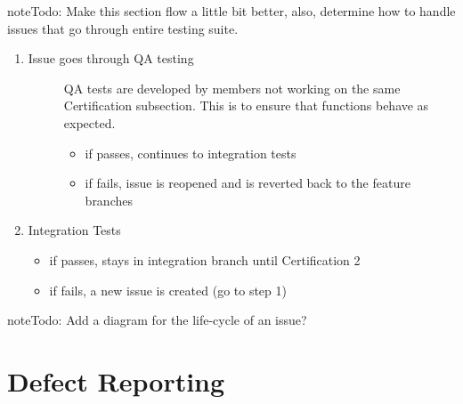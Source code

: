 \documentclass[letterpaper,10pt,english]{sphinxmanual}
\begin{document}
\begin{sphinxadmonition}{note}{\label{test_plan/issue_management:index-2}Todo:}
Make this section flow a little bit better, also, determine how to handle issues that go through entire testing suite.
\end{sphinxadmonition}
\begin{enumerate}
\def\theenumi{\arabic{enumi}}
\def\labelenumi{\theenumi .}
\makeatletter\def\p@enumii{\p@enumi \theenumi .}\makeatother
\setcounter{enumi}{5}
\item {} \begin{description}
\item[{Issue goes through QA testing}] \leavevmode
QA tests are developed by members not working on the same Certification subsection. This is to ensure that functions behave as expected.
\begin{itemize}
\item {} 
if passes, continues to integration tests

\item {} 
if fails, issue is reopened and is reverted back to the feature branches

\end{itemize}

\end{description}

\item {} 
Integration Tests
\begin{itemize}
\item {} 
if passes, stays in integration branch until Certification 2

\item {} 
if fails, a new issue is created (go to step 1)

\end{itemize}

\end{enumerate}

\begin{sphinxadmonition}{note}{\label{test_plan/issue_management:index-3}Todo:}
Add a diagram for the life-cycle of an issue?
\end{sphinxadmonition}


\section{Defect Reporting}
\label{\detokenize{test_plan/issue_management:defect-reporting}}
\end{document}
